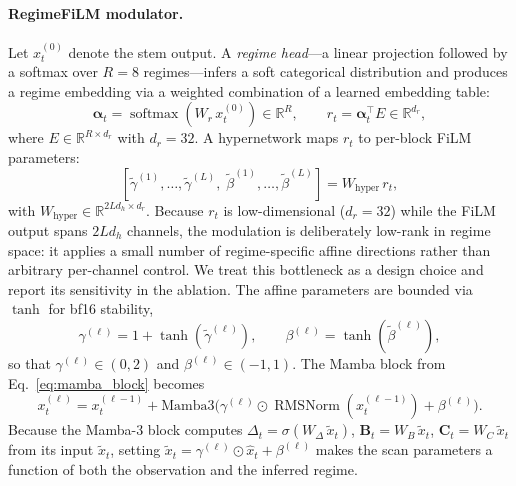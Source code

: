 \documentclass{article}
\newcommand{\R}{\mathbb{R}}
\DeclareMathOperator{\softmax}{softmax}
\DeclareMathOperator{\RMSNorm}{RMSNorm}
\begin{document}
\paragraph{RegimeFiLM modulator.}
Let $x_t^{(0)}$ denote the stem output.  A \emph{regime head}---a linear
projection followed by a softmax over $R = 8$ regimes---infers a soft
categorical distribution and produces a regime embedding via a weighted
combination of a learned embedding table:
\begin{equation}\label{eq:regime_head}
  \bm{\alpha}_t = \softmax(W_r\,x_t^{(0)}) \in \R^R,
  \qquad
  r_t = \bm{\alpha}_t^\top E \in \R^{d_r},
\end{equation}
where $E \in \R^{R \times d_r}$ with $d_r = 32$.  A hypernetwork maps
$r_t$ to per-block FiLM parameters:
\begin{equation}\label{eq:film}
  [\tilde{\gamma}^{(1)}, \ldots, \tilde{\gamma}^{(L)},\;
   \tilde{\beta}^{(1)}, \ldots, \tilde{\beta}^{(L)}]
  = W_{\text{hyper}}\,r_t,
\end{equation}
with $W_{\text{hyper}} \in \R^{2Ld_h \times d_r}$.  Because $r_t$ is
low-dimensional ($d_r = 32$) while the FiLM output spans $2Ld_h$
channels, the modulation is deliberately low-rank in regime space: it
applies a small number of regime-specific affine directions rather than
arbitrary per-channel control.  We treat this bottleneck as a design
choice and report its sensitivity in the ablation.  The affine
parameters are bounded via $\tanh$ for bf16 stability,
\begin{equation}\label{eq:film_bounded}
  \gamma^{(\ell)} = 1 + \tanh(\tilde{\gamma}^{(\ell)}),
  \qquad
  \beta^{(\ell)} = \tanh(\tilde{\beta}^{(\ell)}),
\end{equation}
so that $\gamma^{(\ell)} \in (0, 2)$ and $\beta^{(\ell)} \in (-1, 1)$.
The Mamba block from Eq.~\eqref{eq:mamba_block} becomes
\begin{equation}\label{eq:mamba_film}
  x_t^{(\ell)} = x_t^{(\ell-1)}
  + \mathrm{Mamba3}\!\bigl(
    \gamma^{(\ell)} \odot \RMSNorm(x_t^{(\ell-1)})
    + \beta^{(\ell)}
  \bigr).
\end{equation}
Because the Mamba-3 block computes $\Delta_t =
\sigma(W_\Delta\,\tilde{x}_t)$, $\mathbf{B}_t = W_B\,\tilde{x}_t$,
$\mathbf{C}_t = W_C\,\tilde{x}_t$ from its input $\tilde{x}_t$, setting
$\tilde{x}_t = \gamma^{(\ell)} \odot \hat{x}_t + \beta^{(\ell)}$ makes
the scan parameters a function of both the observation and the inferred
regime.
\end{document}
